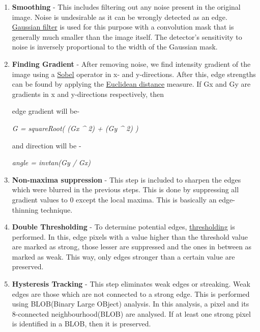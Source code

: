 \documentclass[]{article}
\begin{document}
\begin{enumerate}
\def\labelenumi{\arabic{enumi}.}
\item
  \textbf{Smoothing} - This includes filtering out any noise present in
  the original image. Noise is undesirable as it can be wrongly detected
  as an edge.
  \href{https://github.com/eyantrainternship/eYSIP_2015_Marker_based_Robot_Localisation/wiki/Image-Filtering}{Gaussian
  filter} is used for this purpose with a convolution mask that is
  generally much smaller than the image itself. The detector's
  sensitivity to noise is inversely proportional to the width of the
  Gaussian mask.
\item
  \textbf{Finding Gradient} - After removing noise, we find intensity
  gradient of the image using a
  \href{https://github.com/eyantrainternship/eYSIP_2015_Marker_based_Robot_Localisation/wiki/Line-Detection:-Part-1}{Sobel}
  operator in x- and y-directions. After this, edge strengths can be
  found by applying the
  \href{https://github.com/eyantrainternship/eYSIP_2015_Marker_based_Robot_Localisation/wiki/Distance-Transformation}{Euclidean
  distance} measure. If Gx and Gy are gradients in x and y-directions
  respectively, then

  edge gradient will be-

  \emph{G = squareRoot( (Gx \^{} 2) + (Gy \^{} 2) )}

  and direction will be -

  \emph{angle = invtan(Gy / Gx)}
\item
  \textbf{Non-maxima suppression} - This step is included to sharpen the
  edges which were blurred in the previous steps. This is done by
  suppressing all gradient values to 0 except the local maxima. This is
  basically an edge-thinning technique.
\item
  \textbf{Double Thresholding} - To determine potential edges,
  \href{https://github.com/eyantrainternship/eYSIP_2015_Marker_based_Robot_Localisation/wiki/Thresholding}{thresholding}
  is performed. In this, edge pixels with a value higher than the
  threshold value are marked as strong, those lesser are suppressed and
  the ones in between as marked as weak. This way, only edges stronger
  than a certain value are preserved.
\item
  \textbf{Hysteresis Tracking} - This step eliminates weak edges or
  streaking. Weak edges are those which are not connected to a strong
  edge. This is performed using BLOB(Binary Large OBject) analysis. In
  this analysis, a pixel and its 8-connected neighbourhood(BLOB) are
  analysed. If at least one strong pixel is identified in a BLOB, then
  it is preserved.
\end{enumerate}
\end{document}
